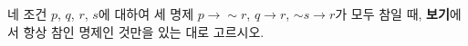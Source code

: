 네 조건 $p$, $q$, $r$, $s$에 대하여 세 명제 $p\longrightarrow \sim r$, $q\longrightarrow r$, $\sim s\longrightarrow r$가 모두 참일 때, \textbf{보기}에서 항상 참인 명제인 것만을 있는 대로 고르시오. 
